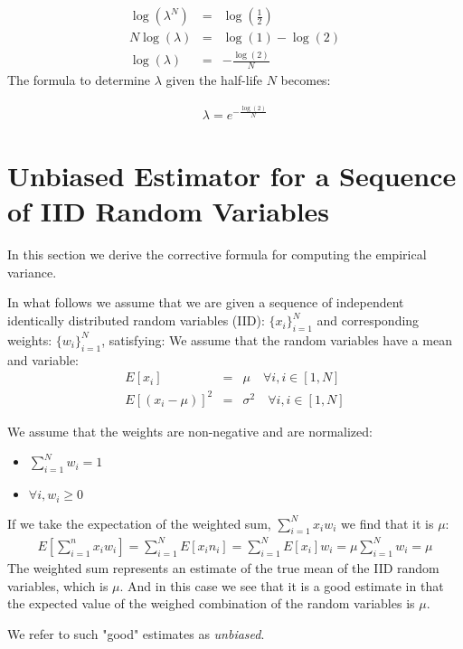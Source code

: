 \documentclass{article}
\begin{document}
\begin{eqnarray*}
    \log(\lambda^N) & = & \log(\frac{1}{2}) \\
    N \log(\lambda) & = & \log(1) - \log(2) \\
    \log(\lambda) & = & -\frac{\log(2)}{N}
\end{eqnarray*}
The formula to determine $\lambda$ given the half-life $N$ becomes:

\begin{eqnarray}
    \lambda = e^{-\frac{\log(2)}{N}}
\end{eqnarray}

\appendix

\section{Unbiased Estimator for a Sequence of IID Random Variables}
In this section we derive the corrective formula for computing the empirical variance.

In what follows we assume that we are given a sequence of independent identically distributed random variables (IID):
$\{x_i\}_{i=1}^N$ and corresponding weights: $\{w_i\}_{i=1}^N$, satisfying:
We assume that the random variables have a mean and variable:
\begin{eqnarray}
    E[x_i] & = & \mu  \quad \forall i, i \in [1, N] \\
    E[(x_i - \mu)]^2 & = & \sigma^2 \quad \forall i, i \in [1, N] 
\end{eqnarray}

We assume that the weights are non-negative and are normalized:
\begin{itemize}
    \item{$\sum_{i=1}^N w_i = 1$}
    \item{$\forall i, w_i \ge 0$}
\end{itemize}

If we take the expectation of the weighted sum, $\sum_{i=1}^N x_i w_i$ we find that it is $\mu$:
\begin{eqnarray}
    E[\sum_{i=1}^n x_i w_i] = \sum_{i=1}^N E[x_i n_i ] = \sum_{i=1}^N E[x_i] w_i = \mu \sum_{i=1}^N w_i = \mu
\end{eqnarray}
The weighted sum represents an estimate of the true mean of the IID random variables, which is $\mu$.
And in this case we see that it is a good estimate in that the expected value of the weighed combination
of the random variables is $\mu$. 

We refer to such "good" estimates as {\em unbiased\/}.
\end{document}

